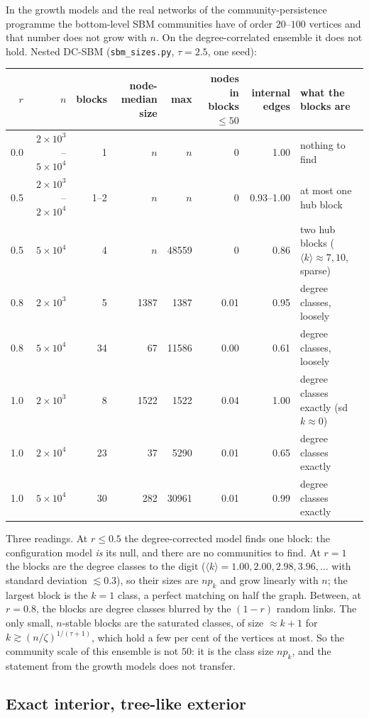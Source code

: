 \documentclass[11pt]{article}
\newcommand{\ave}[1]{\langle #1\rangle}
\begin{document}
In the growth models and the real networks of the community-persistence
programme the bottom-level SBM communities have of order $20$--$100$ vertices
and that number does not grow with $n$. On the degree-correlated ensemble it
does not hold. Nested DC-SBM (\texttt{sbm\_sizes.py}, $\tau=2.5$, one seed):
\begin{center}
\small
\begin{tabular}{rrrrrrrl}
\toprule
$r$ & $n$ & blocks & node-median size & max & nodes in blocks $\le50$ & internal edges & what the blocks are\\
\midrule
0.0 & $2\times10^3$--$5\times10^4$ & 1 & $n$ & $n$ & 0 & 1.00 & nothing to find\\
0.5 & $2\times10^3$--$2\times10^4$ & 1--2 & $n$ & $n$ & 0 & 0.93--1.00 & at most one hub block\\
0.5 & $5\times10^4$ & 4 & $n$ & 48559 & 0 & 0.86 & two hub blocks ($\ave k\approx7,10$, sparse)\\
0.8 & $2\times10^3$ & 5 & 1387 & 1387 & 0.01 & 0.95 & degree classes, loosely\\
0.8 & $5\times10^4$ & 34 & 67 & 11586 & 0.00 & 0.61 & degree classes, loosely\\
1.0 & $2\times10^3$ & 8 & 1522 & 1522 & 0.04 & 1.00 & degree classes exactly (sd $k\approx0$)\\
1.0 & $2\times10^4$ & 23 & 37 & 5290 & 0.01 & 0.65 & degree classes exactly\\
1.0 & $5\times10^4$ & 30 & 282 & 30961 & 0.01 & 0.99 & degree classes exactly\\
\bottomrule
\end{tabular}
\end{center}
Three readings. At $r\le0.5$ the degree-corrected model finds one block:
the configuration model \emph{is} its null, and there are no communities to
find. At $r=1$ the blocks are the degree classes to the digit
($\ave{k}=1.00,2.00,2.98,3.96,\dots$ with standard deviation $\lesssim0.3$),
so their sizes are $np_k$ and grow linearly with $n$; the largest block is
the $k=1$ class, a perfect matching on half the graph. Between, at $r=0.8$,
the blocks are degree classes blurred by the $(1-r)$ random links. The only
small, $n$-stable blocks are the saturated classes, of size $\approx k+1$ for
$k\gtrsim(n/\zeta)^{1/(\tau+1)}$, which hold a few per cent of the vertices
at most. So the community scale of this ensemble is not $50$: it is the class
size $np_k$, and the statement from the growth models does not transfer.

\subsection{Exact interior, tree-like exterior}
\end{document}
